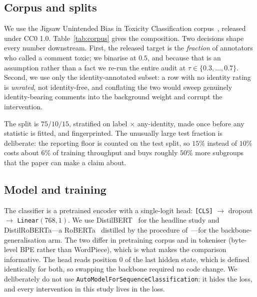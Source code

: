 \documentclass[conference]{IEEEtran}
\begin{document}
\subsection{Corpus and splits}
We use the Jigsaw Unintended Bias in Toxicity Classification
corpus~\cite{jigsaw2019}, released under CC0 1.0. Table~\ref{tab:corpus} gives
the composition. Two decisions shape every number downstream. First, the released
target is the \emph{fraction} of annotators who called a comment toxic; we
binarise at $0.5$, and because that is an assumption rather than a fact we re-run
the entire audit at $\tau \in \{0.3, \ldots, 0.7\}$. Second, we use only the
identity-annotated subset: a row with no identity rating is \emph{unrated}, not
identity-free, and conflating the two would sweep genuinely identity-bearing
comments into the background weight and corrupt the intervention.

The split is $75/10/15$, stratified on label $\times$ any-identity, made once
before any statistic is fitted, and fingerprinted. The unusually large test
fraction is deliberate: the reporting floor is counted on the test split, so
$15\%$ instead of $10\%$ costs about $6\%$ of training throughput and buys
roughly $50\%$ more subgroups that the paper can make a claim about.

\begin{table}[t]
\caption{Corpus composition and reporting coverage}
\label{tab:corpus}
\centering
\small
\setlength{\tabcolsep}{4pt}

\end{table}

\subsection{Model and training}
The classifier is a pretrained encoder with a single-logit head:
\texttt{[CLS]} $\rightarrow$ dropout $\rightarrow$ \texttt{Linear}$(768,1)$.
We use DistilBERT~\cite{sanh2019} for the headline study and DistilRoBERTa---a
RoBERTa~\cite{liu2019} distilled by the procedure of~\cite{sanh2019}---for the
backbone-generalisation arm. The two differ in pretraining corpus and in
tokeniser (byte-level BPE rather than WordPiece), which is what makes the
comparison informative. The head reads position $0$ of the last hidden state,
which is defined identically for both, so swapping the backbone required no code
change. We deliberately do not use
\texttt{AutoModelForSequenceClassification}: it hides the loss, and every
intervention in this study lives in the loss.
\end{document}
